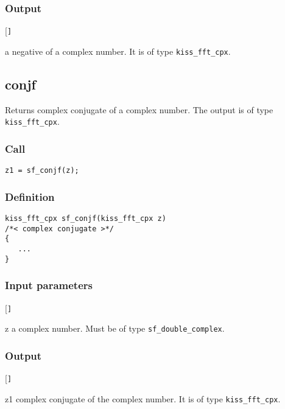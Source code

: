 \subsubsection*{Output}
\begin{desclist}{\tt }{\quad}[\tt ]
   \setlength\itemsep{0pt}
   \item[a] negative of a complex number. It is of type \texttt{kiss\_fft\_cpx}.
\end{desclist}




\subsection{{conjf}}
Returns complex conjugate of a complex number. The output is of type \texttt{kiss\_fft\_cpx}.

\subsubsection*{Call}
\begin{verbatim}z1 = sf_conjf(z);\end{verbatim}

\subsubsection*{Definition}
\begin{verbatim}
kiss_fft_cpx sf_conjf(kiss_fft_cpx z)
/*< complex conjugate >*/
{
   ...
}
\end{verbatim}

\subsubsection*{Input parameters}
\begin{desclist}{\tt }{\quad}[\tt ]
   \setlength\itemsep{0pt}
   \item[z] a complex number. Must be of type \texttt{sf\_double\_complex}.  
\end{desclist}

\subsubsection*{Output}
\begin{desclist}{\tt }{\quad}[\tt ]
   \setlength\itemsep{0pt}
   \item[z1] complex conjugate of the complex number. It is of type \texttt{kiss\_fft\_cpx}.
\end{desclist}




